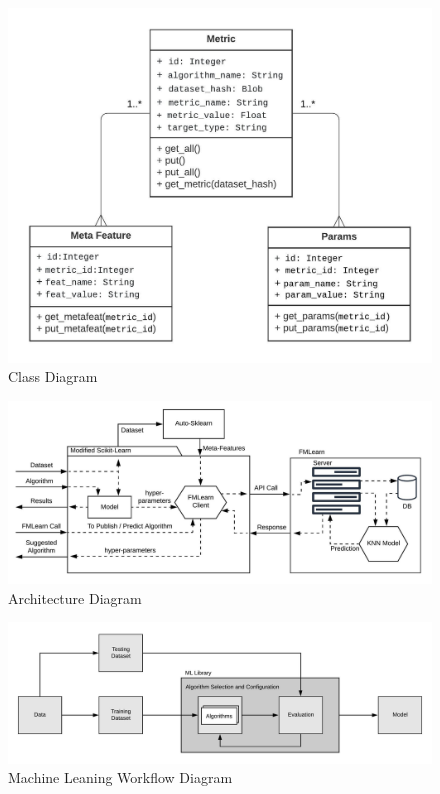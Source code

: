 \begin{figure}[H]
    \centering
    \includegraphics[width=15cm]{images/Class Diagram.jpeg}
    \caption{Class Diagram}
    \label{class-diagram}
\end{figure}

\begin{figure}[H]
    \centering
    \includegraphics[width=15cm]{images/FML Architecture Diagram.jpeg}
    \caption{Architecture Diagram}
    \label{architecture-diagram}
\end{figure}

\begin{figure}[H]
    \centering
    \includegraphics[width=15cm]{images/ML Workflow.jpeg}
    \caption{Machine Leaning Workflow Diagram}
    \label{ml-workflow-diagram}
\end{figure}

